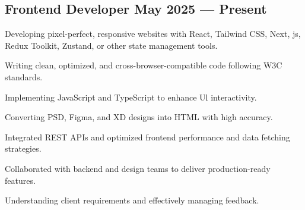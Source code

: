 \subsection{\texorpdfstring{Frontend Developer \hfill May 2025 --- Present}{Frontend Developer - May 2025 - Present}}
\begin{zitemize}
    \item Developing pixel-perfect, responsive websites with React, Tailwind CSS, Next, js, Redux Toolkit, Zustand, or other state management tools.
    \item Writing clean, optimized, and cross-browser-compatible code following W3C standards.
    \item Implementing JavaScript and TypeScript to enhance Ul interactivity.
    \item Converting PSD, Figma, and XD designs into HTML with high accuracy.
    \item Integrated REST APIs and optimized frontend performance and data fetching strategies.
    \item Collaborated with backend and design teams to deliver production-ready features.
    \item Understanding client requirements and effectively managing feedback.
\end{zitemize}

